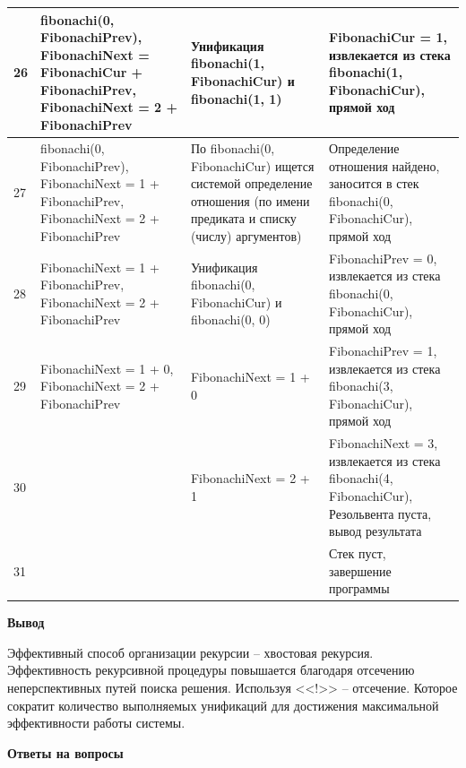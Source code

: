 \documentclass[a4paper,14pt]{extreport} %
\begin{document}
\begin{longtable}{|p{0.5cm}|p{5cm}|p{6cm}|p{5.5cm}|}
	26 & fibonachi(0, FibonachiPrev), FibonachiNext = FibonachiCur + FibonachiPrev, FibonachiNext = 2 + FibonachiPrev  & Унификация fibonachi(1, FibonachiCur) и fibonachi(1, 1) & FibonachiCur = 1, извлекается из стека fibonachi(1, FibonachiCur), прямой ход \\ \hline
	
	27 & fibonachi(0, FibonachiPrev), FibonachiNext = 1 + FibonachiPrev, FibonachiNext = 2 + FibonachiPrev  & По fibonachi(0, FibonachiCur) ищется системой определение отношения (по имени предиката и списку (числу) аргументов) & Определение отношения найдено, заносится в стек fibonachi(0, FibonachiCur), прямой ход \\ \hline

	28 & FibonachiNext = 1 + FibonachiPrev, FibonachiNext = 2 + FibonachiPrev  & Унификация fibonachi(0, FibonachiCur) и fibonachi(0, 0) & FibonachiPrev = 0, извлекается из стека fibonachi(0, FibonachiCur), прямой ход \\ \hline
	
	29 & FibonachiNext = 1 + 0, FibonachiNext = 2 + FibonachiPrev  & FibonachiNext = 1 + 0 & FibonachiPrev = 1, извлекается из стека fibonachi(3, FibonachiCur), прямой ход \\ \hline
	
	30 &  & FibonachiNext = 2 + 1  & FibonachiNext = 3, извлекается из стека fibonachi(4, FibonachiCur), Резольвента пуста, вывод результата \\ \hline
	
	31 &  &  & Стек пуст, завершение программы \\ \hline

\end{longtable}

\hfill

\textbf{Вывод}

Эффективный способ организации рекурсии --  хвостовая рекурсия. Эффективность рекурсивной процедуры повышается благодаря отсечению неперспективных путей поиска решения. Используя <<!>> -- отсечение. Которое сократит количество выполняемых унификаций для достижения максимальной эффективности работы системы. 

\textbf{Ответы на вопросы}
\end{document}
